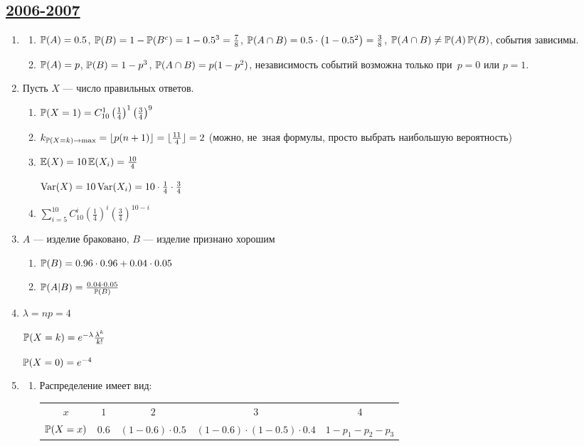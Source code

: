 \subsection[2006-2007]{\hyperref[sec:kr_01_2006_2007]{2006-2007}}
\label{sec:sol_kr_01_2006_2007}


\begin{enumerate}
\item
\begin{enumerate}
\item $\P(A) = 0.5$, $\P(B) = 1 - \P(B^{c}) = 1 - 0.5^{3} = \frac{7}{8}$,
$\P(A \cap B) = 0.5 \cdot \left(1 - 0.5^{2}\right) = \frac{3}{8}$,
$\P(A \cap B)\neq \P(A)\P(B)$, события зависимы.
\item $\P(A) = p$, $\P(B) = 1 - p^{3}$, $\P(A \cap B) = p(1 - p^{2})$,
независимость событий возможна только при~$p = 0$ или $p = 1$.
\end{enumerate}
\item  Пусть $X$ — число правильных ответов.
\begin{enumerate}
\item $\P(X = 1) = C_{10}^{1} \left(\frac{1}{4}\right)^{1}\left(\frac{3}{4}\right)^{9}$
\item $k_{\P(X = k)\rightarrow \max}=\lfloor p(n + 1)\rfloor = \lfloor
\frac{11}{4}\rfloor=2$ (можно, не~зная формулы, просто выбрать наибольшую вероятность)
\item $\E(X) = 10\E(X_{i}) = \frac{10}{4}$

$\Var(X) = 10 \Var(X_{i}) = 10 \cdot \frac{1}{4} \cdot \frac{3}{4}$
\item $\sum_{i=5}^{10}C_{10}^{i} \left(\frac{1}{4}\right)^{i}\left(\frac{3}{4}\right)^{10-i}$
\end{enumerate}
\item $A$ — изделие браковано, $B$ — изделие признано хорошим
\begin{enumerate}
\item $\P(B) = 0.96\cdot 0.96+0.04\cdot 0.05$
\item $\P(A|B) = \frac{0.04\cdot 0.05}{\P(B)}$
\end{enumerate}
\item $\lambda = np = 4$

$\P(X = k) = e^{-\lambda}\frac{\lambda^{k}}{k!}$

$\P(X = 0) = e^{-4}$
\item
\begin{enumerate}
\item Распределение имеет вид:

\begin{center}
\begin{tabular}{@{}ccccc@{}}
\toprule
$x$       & $1$   & $2$               & $3$                           & $4$             \\
$\P(X=x)$ & $0.6$ & $(1-0.6)\cdot0.5$ & $(1-0.6)\cdot(1-0.5)\cdot0.4$ & $1-p_1-p_2-p_3$ \\ \bottomrule
\end{tabular}
\end{center}


\end{enumerate}
\end{enumerate}
